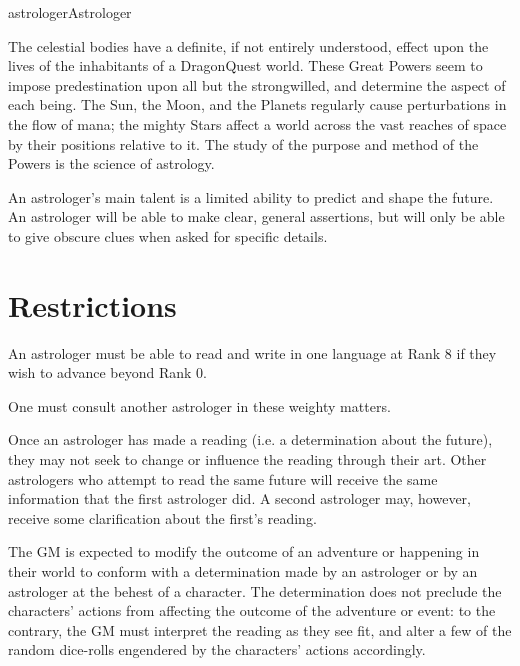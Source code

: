 \begin{Skill}{astrologer}{Astrologer}

The celestial bodies have a definite, if not entirely understood,
effect upon the lives of the inhabitants of a DragonQuest world. These
Great Powers seem to impose predestination upon all but the
strongwilled, and determine the aspect of each being. The Sun, the
Moon, and the Planets regularly cause perturbations in the flow of
mana; the mighty Stars affect a world across the vast reaches of space
by their positions relative to it.  The study of the purpose and
method of the Powers is the science of astrology.

An astrologer’s main talent is a limited ability to predict and shape
the future. An astrologer will be able to make clear, general
assertions, but will only be able to give obscure clues when asked for
specific details.

\section{Restrictions}

An astrologer must be able to read and write in one language at Rank 8
if they wish to advance beyond Rank 0.


One must consult another astrologer in these weighty matters.


Once an astrologer has made a reading (i.e. a determination about the
future), they may not seek to change or influence the reading through
their art.  Other astrologers who attempt to read the same future will
receive the same information that the first astrologer did. A second
astrologer may, however, receive some clarification about the
first’s reading.


The GM is expected to modify the outcome of an adventure or happening
in their world to conform with a determination made by an astrologer
or by an astrologer at the behest of a character.  The determination
does not preclude the characters’ actions from affecting the outcome
of the adventure or event: to the contrary, the GM must interpret the
reading as they see fit, and alter a few of the random dice-rolls
engendered by the characters’ actions accordingly.


\end{Skill}
